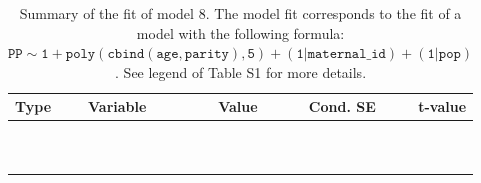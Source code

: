 \begin{table}

\caption{\label{tab:tab8}Summary of the fit of model 8. The model fit corresponds to the fit of a model with the following formula: {\small$\mathtt{PP \sim 1 + poly(cbind(age, parity), 5) + (1 | maternal\_id) + (1 | pop)}$}. See legend of Table S1 for more details.}
\centering
\fontsize{8}{10}\selectfont
\begin{tabular}[t]{>{\raggedright\arraybackslash}p{3cm}>{\raggedright\arraybackslash}p{5cm}rrr}
\toprule
Type & Variable & Value & Cond. SE & t-value\\
\midrule
\cellcolor{gray!6}{fixed effects} & \cellcolor{gray!6}{$\beta_1$} & \cellcolor{gray!6}{1.56} & \cellcolor{gray!6}{0.179} & \cellcolor{gray!6}{8.67}\\
\cellcolor{gray!6}{} & \cellcolor{gray!6}{$\beta_{\mathtt{age}}$} & \cellcolor{gray!6}{-421} & \cellcolor{gray!6}{59.7} & \cellcolor{gray!6}{-7.04}\\
\cellcolor{gray!6}{} & \cellcolor{gray!6}{$\beta_{\mathtt{age}^2}$} & \cellcolor{gray!6}{-185} & \cellcolor{gray!6}{51.8} & \cellcolor{gray!6}{-3.57}\\
\cellcolor{gray!6}{} & \cellcolor{gray!6}{$\beta_{\mathtt{age}^3}$} & \cellcolor{gray!6}{-43.4} & \cellcolor{gray!6}{32.6} & \cellcolor{gray!6}{-1.33}\\
\cellcolor{gray!6}{} & \cellcolor{gray!6}{$\beta_{\mathtt{age}^4}$} & \cellcolor{gray!6}{-15.8} & \cellcolor{gray!6}{14.4} & \cellcolor{gray!6}{-1.1}\\
\cellcolor{gray!6}{} & \cellcolor{gray!6}{$\beta_{\mathtt{age}^5}$} & \cellcolor{gray!6}{2.3} & \cellcolor{gray!6}{9.7} & \cellcolor{gray!6}{0.237}\\
\cellcolor{gray!6}{} & \cellcolor{gray!6}{$\beta_{\mathtt{parity}}$} & \cellcolor{gray!6}{48} & \cellcolor{gray!6}{97.7} & \cellcolor{gray!6}{0.491}\\
\cellcolor{gray!6}{} & \cellcolor{gray!6}{$\beta_{\mathtt{age}\times\mathtt{parity}}$} & \cellcolor{gray!6}{13240} & \cellcolor{gray!6}{39545} & \cellcolor{gray!6}{0.335}\\
\cellcolor{gray!6}{} & \cellcolor{gray!6}{$\beta_{\mathtt{age}^2\times\mathtt{parity}}$} & \cellcolor{gray!6}{-34019} & \cellcolor{gray!6}{30565} & \cellcolor{gray!6}{-1.11}\\
\cellcolor{gray!6}{} & \cellcolor{gray!6}{$\beta_{\mathtt{age}^3\times\mathtt{parity}}$} & \cellcolor{gray!6}{-330} & \cellcolor{gray!6}{14760} & \cellcolor{gray!6}{-0.0224}\\

\end{tabular}
\end{table}
